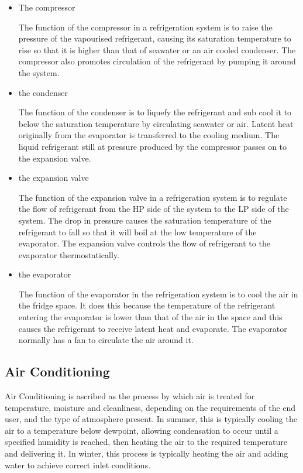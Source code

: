 \documentclass[11pt,a4paper]{article}
\begin{document}
\begin{itemize}
\item The compressor

The function of the compressor in a refrigeration system is to raise the pressure of the vapourised refrigerant, causing its saturation temperature to rise so that it is higher than that of seawater or an air cooled condenser. The compressor also promotes circulation of the refrigerant by pumping it around the system.
\item   the condenser

The function of the condenser is to liquefy the refrigerant and sub cool it to below the saturation temperature by circulating seawater or air. Latent heat originally from the evaporator is transferred to the cooling medium. The liquid refrigerant still at pressure produced by the compressor passes on to the expansion valve.
\item   the expansion valve

The function of the expansion valve in a refrigeration system is to regulate the flow of refrigerant from the HP side of the system to the LP side of the system. The drop in pressure causes the saturation temperature of the refrigerant to fall so that it will boil at the low temperature of the evaporator. The expansion valve controls the flow of refrigerant to the evaporator thermostatically.
\item   the evaporator

The function of the evaporator in the refrigeration system is to cool the air in the fridge space. It does this because the temperature of the refrigerant entering the evaporator is lower than that of the air in the space and this causes the refrigerant to receive latent heat and evaporate. The evaporator normally has a fan to circulate the air around it.
\end{itemize}

\subsection{Air Conditioning}
Air Conditioning is ascribed as the process by which air is treated for temperature, moisture and cleanliness, depending on the requirements of the end user, and the type of atmosphere present. In summer, this is typically cooling the air to a temperature below dewpoint, allowing condensation to occur until a specified humidity is reached, then heating the air to the required temperature and delivering it. In winter, this process is typically heating the air and adding water to achieve correct inlet conditions.
\end{document}
